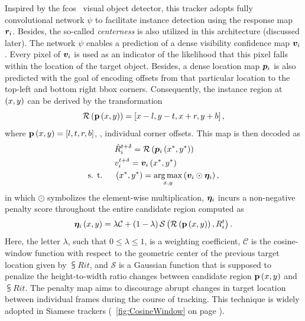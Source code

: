 Inspired by the \gls{fcos}~\cite{tian2019fcos} visual object detector, this tracker adopts fully convolutional network $\psi$ to facilitate instance detection using the response map $\bm{r}_{i}$. Besides, the so-called \emph{centerness} is also utilized in this architecture (discussed later). The network $\psi$ enables a prediction of a dense visibility confidence map $\bm{v}_{i}$. Every pixel of $\bm{v}_{i}$ is used as an indicator of the likelihood that this pixel falls within the location of the target object. Besides, a dense location map $\bm{p}_{i}$ is also predicted with the goal of encoding offsets from that particular location to the top-left and bottom right \gls{bbox} corners. Consequently, the instance region at $\left( {x, y} \right)$ can be derived by the transformation
\begin{equation}
    {\mathcal{R}} \left( {\mathbf{p}} \left( x, y \right) \right) =
    \left[ {x - l, y - t, x + r, y + b} \right],
\end{equation}
where ${\mathbf{p}} \left( x, y \right) = \left[ {l, t, r, b} \right]$, \ietext{}, individual corner offsets. This map is then decoded as
\begin{equation}
    \begin{aligned}
                            & {\tilde{R}}_{i}^{t + \delta} =
        {\mathcal{R}} \left( {\bm{p}_{i}} \left( x^*, y^* \right) \right)                                                                      \\
                            & {v}_{i}^{t + \delta} = {\bm{v}_{i}} \left( x^*, y^* \right)                                        \\
        \text{s. t. } \quad & \left( {x^*, y^*} \right) = \underset{x, y}{\operatorname*{arg\,max}} \left( {\bm{v}_{i} \odot \bm{\eta}_{i}} \right),
    \end{aligned}
\end{equation}
in which $\odot$ symbolizes the element-wise multiplication, $\bm{\eta}_{i}$ incurs a non-negative penalty score throughout the entire candidate region computed as
\begin{equation}
    {\bm{\eta}_{i}} \left( x, y \right) =
    \lambda \mathcal{C} +
    \left( {1 - \lambda} \right) {\mathcal{S}} \left( 
        {\mathcal{R}} \left( 
            {\mathbf{p}} \left( x, y \right)
         \right),
        {R}_{i}^{t}
     \right).
\end{equation}
Here, the letter $\lambda$, such that $0 \leq \lambda \leq 1$, is a weighting coefficient, $\mathcal{C}$ is the cosine-window function with respect to the geometric center of the previous target location given by $\subsup{R}{i}{t}$, and $\mathcal{S}$ is a Gaussian function that is supposed to penalize the height-to-width ratio changes between candidate region ${\mathbf{p}} \left( x, y \right)$ and $\subsup{R}{i}{t}$. The penalty map aims to discourage abrupt changes in target location between individual frames during the course of tracking. This technique is widely adopted in Siamese trackers (\figtext{}~\ref{fig:CosineWindow} on page \pageref{fig:CosineWindow}).

